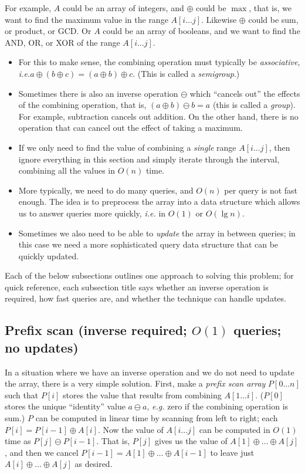 \documentclass[10pt]{book}
\newcommand{\eg}{\emph{e.g.}\xspace}
\newcommand{\ie}{\emph{i.e.}\xspace}
\begin{document}
For example, $A$ could be an array of integers, and $\oplus$ could be
$\max$, that is, we want to find the maximum value in the range
$A[i \dots j]$.  Likewise $\oplus$ could be sum, or product, or GCD.
Or $A$ could be an array of booleans, and we want to find the AND, OR,
or XOR of the range $A[i \dots j]$.

\begin{itemize}
\item For this to make sense, the combining operation must typically
  be \emph{associative}, \ie $a \oplus (b \oplus c) = (a \oplus b) \oplus
  c$.  (This is called a \emph{semigroup}.)
\item Sometimes there is also an inverse operation $\ominus$ which
  ``cancels out'' the effects of the combining operation, that is, $(a
  \oplus b) \ominus b = a$ (this is called a \emph{group}).  For
  example, subtraction cancels out addition. On the other hand, there
  is no operation that can cancel out the effect of taking a maximum.
\item If we only need to find the value of combining a \emph{single}
  range $A[i \dots j]$, then ignore everything in this section and
  simply iterate through the interval, combining all the values in
  $O(n)$ time.
\item More typically, we need to do many queries, and $O(n)$ per query
  is not fast enough.  The idea is to preprocess the array into a data
  structure which allows us to answer queries more quickly, \ie in
  $O(1)$ or $O(\lg n)$.
\item Sometimes we also need to be able to \emph{update} the array in
  between queries; in this case we need a more sophisticated query
  data structure that can be quickly updated.
\end{itemize}

Each of the below subsections outlines one approach to solving this
problem; for quick reference, each subsection title says whether an
inverse operation is required, how fast queries are, and whether the
technique can handle updates.

\subsection{Prefix scan (inverse required; $O(1)$ queries; no updates)}

In a situation where we have an inverse operation and we do not need
to update the array, there is a very simple solution.  First, make a
\emph{prefix scan array} $P[0 \dots n]$ such that $P[i]$ stores the
value that results from combining $A[1 \dots i]$.  ($P[0]$ stores the
unique ``identity'' value $a \ominus a$, \eg zero if the combining
operation is sum.)  $P$ can be computed in linear time by scanning
from left to right; each $P[i] = P[i-1] \oplus A[i]$.  Now the value
of $A[i \dots j]$ can be computed in $O(1)$ time as
$P[j] \ominus P[i-1]$. That is, $P[j]$ gives us the value of
$A[1] \oplus \dots \oplus A[j]$, and then we cancel
$P[i-1] = A[1] \oplus \dots \oplus A[i-1]$ to leave just
$A[i] \oplus \dots \oplus A[j]$ as desired.
\end{document}
